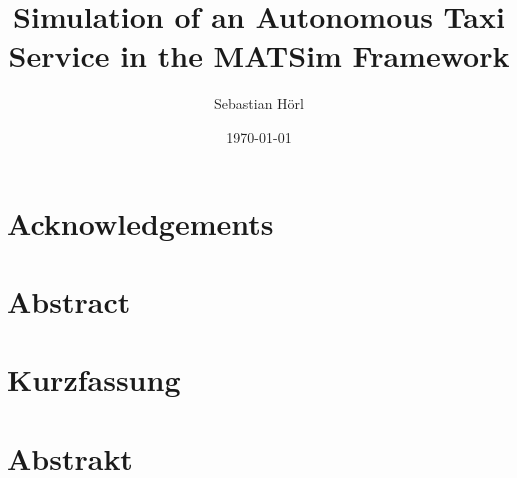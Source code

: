 \documentclass[12pt,a4paper]{article}
\title{Simulation of an Autonomous Taxi Service in the MATSim Framework}
\author{
    Sebastian Hörl
}
\date{\today}
\begin{document}

\pagebreak


\tableofcontents
\pagebreak

\section*{Acknowledgements}
\pagebreak

\section*{Abstract}
\pagebreak

\section*{Kurzfassung}
\pagebreak

\section*{Abstrakt}
\pagebreak


  \pagebreak \FloatBarrier
 \FloatBarrier \pagebreak
 \FloatBarrier \pagebreak
 \FloatBarrier \pagebreak
 \FloatBarrier \pagebreak
 \FloatBarrier \pagebreak
 \FloatBarrier \pagebreak


\end{document}
